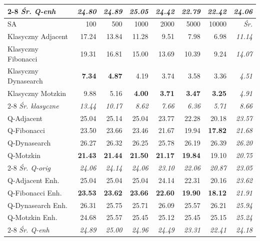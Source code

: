 \documentclass[11pt,a4paper]{article}
\begin{document}
\begin{table}[h]
\begin{tabular}{@{}lrrrrrr@{\quad}r@{}}
\cmidrule(l){2-8}
\emph{Śr. Q-enh}     & \emph{24.80} & \emph{24.89} & \emph{25.05} & \emph{24.42} & \emph{22.79} & \emph{22.42} & \emph{24.06} \\
\midrule
SA & 100 & 500 & 1000 & 2000 & 5000 & 10000 & \emph{Śr.} \\
\midrule
Klasyczny Adjacent   & 17.24 & 13.84 & 11.28 &  9.51 &  7.98 &  6.98 & \emph{11.14} \\
Klasyczny Fibonacci  & 19.31 & 16.81 & 15.00 & 13.69 & 10.39 &  9.24 & \emph{14.07} \\
Klasyczny Dynasearch &  \textbf{7.34} &  \textbf{4.87} &  4.19 &  3.74 &  3.58 &  3.36 & \emph{4.51} \\
Klasyczny Motzkin    &  9.88 &  5.16 &  \textbf{4.00} &  \textbf{3.71} &  \textbf{3.47} &  \textbf{3.25} & \emph{4.91} \\
\cmidrule(l){2-8}
\emph{Śr. klasyczne} & \emph{13.44} & \emph{10.17} & \emph{8.62} & \emph{7.66} & \emph{6.36} & \emph{5.71} & \emph{8.66} \\
\midrule
Q-Adjacent           & 25.04 & 25.14 & 25.04 & 23.77 & 22.28 & 20.18 & \emph{23.57} \\
Q-Fibonacci          & 23.50 & 23.66 & 23.46 & 21.67 & 19.94 & \textbf{17.82} & \emph{21.68} \\
Q-Dynasearch         & 26.27 & 26.32 & 26.25 & 25.78 & 26.19 & 26.39 & \emph{26.20} \\
Q-Motzkin            & \textbf{21.43} & \textbf{21.44} & \textbf{21.50} & \textbf{21.17} & \textbf{19.84} & 19.10 & \emph{20.75} \\
\cmidrule(l){2-8}
\emph{Śr. Q-orig}    & \emph{24.06} & \emph{24.14} & \emph{24.06} & \emph{23.10} & \emph{22.06} & \emph{20.87} & \emph{23.05} \\
\midrule
Q-Adjacent Enh.      & 25.04 & 25.04 & 25.04 & 24.14 & 22.31 & 20.16 & \emph{23.62} \\
Q-Fibonacci Enh.     & \textbf{23.53} & \textbf{23.62} & \textbf{23.66} & \textbf{22.60} & \textbf{19.90} & \textbf{18.12} & \emph{21.91} \\
Q-Dynasearch Enh.    & 26.31 & 25.75 & 25.71 & 26.09 & 25.57 & 26.21 & \emph{25.94} \\
Q-Motzkin Enh.       & 24.68 & 25.57 & 25.45 & 25.12 & 25.45 & 25.15 & \emph{25.24} \\
\cmidrule(l){2-8}
\emph{Śr. Q-enh}     & \emph{24.89} & \emph{25.00} & \emph{24.96} & \emph{24.49} & \emph{23.31} & \emph{22.41} & \emph{24.18} \\
\bottomrule
\end{tabular}
\end{table}
\end{document}

